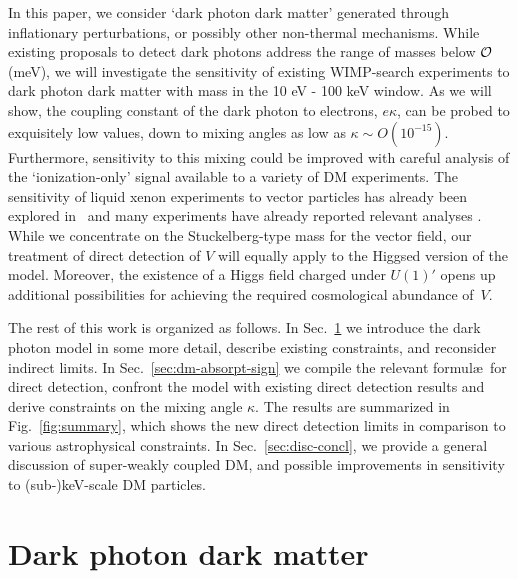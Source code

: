 \documentclass[prd,reprint,nofootinbib,notitlepage,aps,tightenlines,preprintnumbers,amsmath,amssymb,showpacs,superscriptaddress]{revtex4-1}
\begin{document}
In this paper, we consider `dark photon dark matter' generated through
inflationary perturbations, or possibly other non-thermal mechanisms.
While existing proposals to detect dark photons address the range of
masses below ${\cal O}$(meV), we will investigate the sensitivity of
existing WIMP-search experiments to dark photon dark matter with mass
in the 10 eV - 100 keV window.  As we will show, the coupling constant
of the dark photon to electrons, $e\kappa$, can be probed to
exquisitely low values, down to mixing angles as low as
$\kappa \sim O(10^{-15})$.  Furthermore, sensitivity to this mixing
could be improved with careful analysis of the `ionization-only'
signal available to a variety of DM experiments. The sensitivity of
liquid xenon experiments to vector particles has already been explored
in~\cite{Arisaka:2012pb} and many experiments have already reported
relevant analyses
\cite{Bernabei:2005ca,Aalseth:2008rx,Ahmed:2009rh,Horvat:2011jh,Armengaud:2013rta,Abgrall:2014bka,Aprile:2014eoa,Abe:2014zcd}.
%
While we concentrate on the Stuckelberg-type mass for the vector
field, our treatment of direct detection of $V$ will equally apply to
the Higgsed version of the model. Moreover, the existence of a Higgs
field charged under $U(1)'$ opens up additional possibilities for
achieving the required cosmological abundance of~$V$.




The rest of this work is organized as follows. In
Sec.~\ref{sec:dark-photon-dark} we introduce the dark photon model
in some more detail, describe existing constraints, and reconsider
indirect limits. In Sec.~\ref{sec:dm-absorpt-sign} we compile the
relevant formul\ae ~for direct detection, confront the model with
existing direct detection results and derive constraints on the mixing
angle $\kappa$. The results are summarized in Fig.~\ref{fig:summary},
which shows the new direct detection limits in comparison to various
astrophysical constraints. In Sec.~\ref{sec:disc-concl}, we provide a general
discussion of super-weakly coupled DM, and possible improvements in
sensitivity to (sub-)keV-scale DM particles.



\section{Dark photon dark matter} 
\label{sec:dark-photon-dark}
\end{document}
